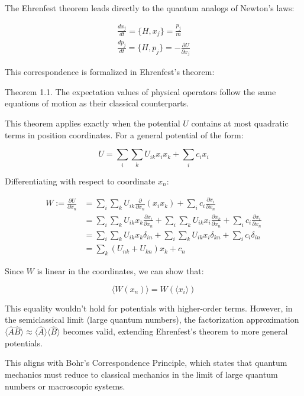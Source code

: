 \documentclass[italian]{HKNdocument}
\begin{document}
The Ehrenfest theorem leads directly to the quantum analogs of Newton's laws:

\[
\begin{array}{r}
\frac{dx_j}{dt} = \{H, x_j\} = \frac{p_j}{m} \\
\frac{dp_j}{dt} = \{H, p_j\} = -\frac{\partial U}{\partial x_j}
\end{array}
\]

This correspondence is formalized in Ehrenfest's theorem:

Theorem 1.1. The expectation values of physical operators follow the same equations of motion as their classical counterparts.

This theorem applies exactly when the potential $U$ contains at most quadratic terms in position coordinates. For a general potential of the form:

\begin{equation}
U = \sum_i \sum_k U_{ik}x_i x_k + \sum_i c_i x_i
\end{equation}

Differentiating with respect to coordinate $x_n$:

\begin{align}
W := \frac{\partial U}{\partial x_n} &= \sum_i \sum_k U_{ik}\frac{\partial}{\partial x_n}(x_i x_k) + \sum_i c_i \frac{\partial x_i}{\partial x_n} \\
&= \sum_i \sum_k U_{ik}x_k\frac{\partial x_i}{\partial x_n} + \sum_i \sum_k U_{ik}x_i\frac{\partial x_k}{\partial x_n} + \sum_i c_i\frac{\partial x_i}{\partial x_n} \\
&= \sum_i \sum_k U_{ik}x_k\delta_{in} + \sum_i \sum_k U_{ik}x_i\delta_{kn} + \sum_i c_i\delta_{in} \\
&= \sum_k(U_{nk} + U_{kn})x_k + c_n
\end{align}

Since $W$ is linear in the coordinates, we can show that:

\begin{equation}
\langle W(x_n)\rangle = W(\langle x_i\rangle)
\end{equation}

This equality wouldn't hold for potentials with higher-order terms. However, in the semiclassical limit (large quantum numbers), the factorization approximation $\langle\hat{A}\hat{B}\rangle \approx \langle\hat{A}\rangle\langle\hat{B}\rangle$ becomes valid, extending Ehrenfest's theorem to more general potentials.

This aligns with Bohr's Correspondence Principle, which states that quantum mechanics must reduce to classical mechanics in the limit of large quantum numbers or macroscopic systems.
\end{document}
